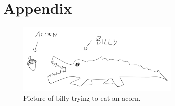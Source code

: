 \documentclass[../main.tex]{article}
\begin{document}
\section{Appendix}

\begin{figure}[ht!]
    \includegraphics[width=0.7\textwidth]{figures/billy.pdf}
    \centering
    \caption{Picture of billy trying to eat an acorn.}
    \label{fig:billy}
\end{figure}
\end{document}
